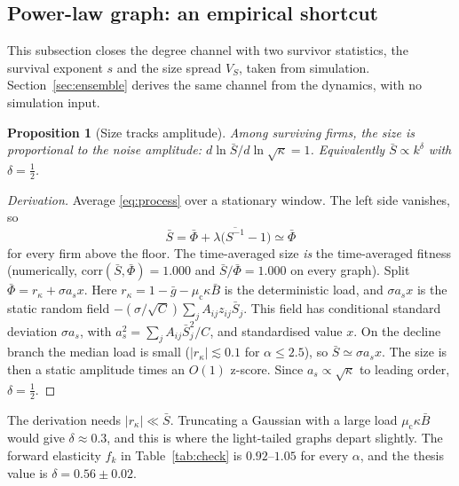 \documentclass[11pt]{article}
\newcommand{\mc}{\mu_{\mathrm c}}
\newtheorem{proposition}{Proposition}
\theoremstyle{remark}
\begin{document}
\subsection{Power-law graph: an empirical shortcut}

This subsection closes the degree channel with two survivor statistics, the survival exponent
$s$ and the size spread $V_S$, taken from simulation.  Section~\ref{sec:ensemble} derives the
same channel from the dynamics, with no simulation input.

\begin{proposition}[Size tracks amplitude]\label{prop:size}
Among surviving firms, the size is proportional to the noise amplitude:
$d\ln\bar S/d\ln\sqrt\kappa=1$.  Equivalently $\bar S\propto k^{\delta}$ with $\delta=\tfrac12$.
\end{proposition}
\begin{proof}[Derivation]
Average \eqref{eq:process} over a stationary window.  The left side vanishes, so
\begin{equation}
  \bar S=\bar\Phi+\lambda\bigl(\overline{S^{-1}}-1\bigr)\simeq\bar\Phi
  \label{eq:stationarity}
\end{equation}
for every firm above the floor.  The time-averaged size \emph{is} the time-averaged fitness
(numerically, $\mathrm{corr}(\bar S,\bar\Phi)=1.000$ and $\bar S/\bar\Phi=1.000$ on every graph).
Split $\bar\Phi=r_\kappa+\sigma a_s x$.  Here $r_\kappa=1-\bar g-\mc\kappa\bar B$ is the
deterministic load, and $\sigma a_s x$ is the static random field
$-(\sigma/\sqrt C)\sum_jA_{ij}z_{ij}\bar S_j$.  This field has conditional standard deviation
$\sigma a_s$, with $a_s^2=\sum_jA_{ij}\bar S_j^2/C$, and standardised value $x$.  On the decline
branch the median load is small ($|r_\kappa|\lesssim0.1$ for $\alpha\le2.5$), so
$\bar S\simeq\sigma a_s x$.  The size is then a static amplitude times an $O(1)$ z-score.  Since
$a_s\propto\sqrt\kappa$ to leading order, $\delta=\tfrac12$.
\end{proof}
The derivation needs $|r_\kappa|\ll\bar S$.  Truncating a Gaussian with a large load
$\mc\kappa\bar B$ would give $\delta\approx0.3$, and this is where the light-tailed graphs
depart slightly.  The forward elasticity $f_k$ in Table~\ref{tab:check} is $0.92$--$1.05$ for
every $\alpha$, and the thesis value is $\delta=0.56\pm0.02$.
\end{document}
